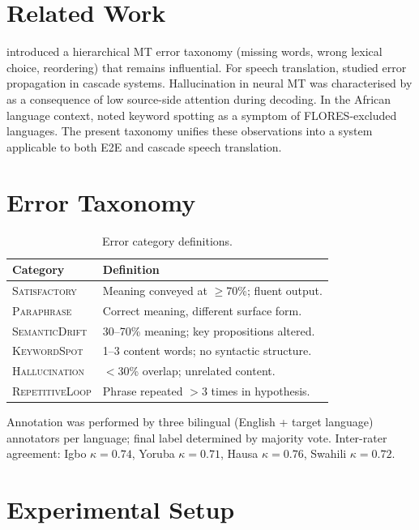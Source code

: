 \documentclass[11pt,a4paper]{article}
\newcommand{\catS}{\textsc{Satisfactory}}
\newcommand{\catH}{\textsc{Hallucination}}
\newcommand{\catR}{\textsc{RepetitiveLoop}}
\newcommand{\catK}{\textsc{KeywordSpot}}
\newcommand{\catD}{\textsc{SemanticDrift}}
\newcommand{\catP}{\textsc{Paraphrase}}
\begin{document}
\section{Related Work}
\label{sec:related}

\citet{vilar2006error} introduced a hierarchical MT error taxonomy (missing words, wrong lexical choice, reordering) that remains influential. For speech translation, \citet{sperber2017cascade} studied error propagation in cascade systems. Hallucination in neural MT was characterised by \citet{li2021hallucination} as a consequence of low source-side attention during decoding. In the African language context, \citet{nekoto2020participatory} noted keyword spotting as a symptom of FLORES-excluded languages. The present taxonomy unifies these observations into a system applicable to both E2E and cascade speech translation.

\section{Error Taxonomy}
\label{sec:taxonomy}

\begin{table}[t]
\centering
\small
\caption{Error category definitions.}
\label{tab:taxonomy}
\begin{tabular}{lp{5.5cm}}
\toprule
\textbf{Category} & \textbf{Definition} \\
\midrule
\catS{}   & Meaning conveyed at $\ge$70\%; fluent output. \\
\catP{}   & Correct meaning, different surface form. \\
\catD{}   & 30–70\% meaning; key propositions altered. \\
\catK{}   & 1–3 content words; no syntactic structure. \\
\catH{}   & $<$30\% overlap; unrelated content. \\
\catR{}   & Phrase repeated $>$3 times in hypothesis. \\
\bottomrule
\end{tabular}
\end{table}

Annotation was performed by three bilingual (English + target language) annotators per language; final label determined by majority vote. Inter-rater agreement: Igbo $\kappa = 0.74$, Yoruba $\kappa = 0.71$, Hausa $\kappa = 0.76$, Swahili $\kappa = 0.72$.

\section{Experimental Setup}
\label{sec:setup}
\end{document}
